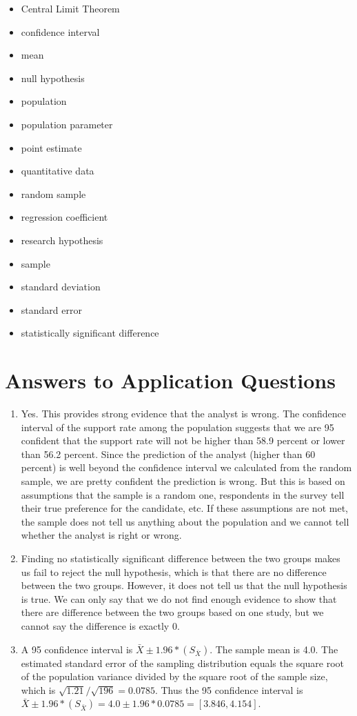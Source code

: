 \documentclass{book}
\begin{document}
\begin{itemize}
\item
  Central Limit Theorem
\item
  confidence interval
\item
  mean
\item
  null hypothesis
\item
  population
\item
  population parameter
\item
  point estimate
\item
  quantitative data
\item
  random sample
\item
  regression coefficient
\item
  research hypothesis
\item
  sample
\item
  standard deviation
\item
  standard error
\item
  statistically significant difference
\end{itemize}

\hypertarget{answers-to-application-questions-3}{%
\section{Answers to Application
Questions}\label{answers-to-application-questions-3}}

\begin{enumerate}
\def\labelenumi{\arabic{enumi}.}
\item
  Yes. This provides strong evidence that the analyst is wrong. The confidence
  interval of the support rate among the population suggests that we are 95
  confident that the support rate will not be higher than 58.9 percent or
  lower than 56.2 percent. Since the prediction of the analyst (higher than 60
  percent) is well beyond the confidence interval we calculated from the
  random sample, we are pretty confident the prediction is wrong. But this is
  based on assumptions that the sample is a random one, respondents in the
  survey tell their true preference for the candidate, etc. If these
  assumptions are not met, the sample does not tell us anything about the
  population and we cannot tell whether the analyst is right or wrong.
\item
  Finding no statistically significant difference between the two groups makes
  us fail to reject the null hypothesis, which is that there are no difference
  between the two groups. However, it does not tell us that the null
  hypothesis is true. We can only say that we do not find enough evidence to
  show that there are difference between the two groups based on one study,
  but we cannot say the difference is exactly 0.
\item
  A 95 confidence interval is \(\bar{X}\pm 1.96 * (S_{\bar{X}})\). The sample
  mean is 4.0. The estimated standard error of the sampling distribution
  equals the square root of the population variance divided by the square root
  of the sample size, which is \(\sqrt{1.21}/\sqrt{196}=0.0785\). Thus the 95
  confidence interval is
  \(\bar{X}\pm 1.96 * (S_{\bar{X}}) = 4.0\pm 1.96* 0.0785= [3.846, 4.154]\).
\end{enumerate}
\end{document}
